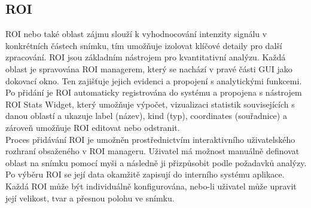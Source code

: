 \documentclass{article}
\begin{document}
\subsection{ROI}
 ROI nebo také oblast zájmu slouží k vyhodnocování intenzity signálu v konkrétních částech snímku, tím umožňuje izolovat klíčové detaily pro další zpracování. ROI jsou základním nástrojem pro kvantitativní analýzu. Každá oblast je spravována ROI managerem, který se nachází v pravé části GUI jako dokovací okno. Ten zajišťuje jejich evidenci a propojení s analytickými funkcemi. Po přidání je ROI automaticky registrována do systému a propojena s nástrojem ROI Stats Widget, který umožňuje výpočet, vizualizaci statistik souvisejících s danou oblastí a ukazuje label (název), kind (typ), coordinates (souřadnice) a zároveň umožňuje ROI editovat nebo odstranit.\\

Proces přidávání ROI je umožněn prostřednictvím interaktivního uživatelského rozhraní obsaženého v ROI manageru. Uživatel má možnost manuálně definovat oblast na snímku pomocí myši a následně ji přizpůsobit podle požadavků analýzy. Po výběru ROI se její data okamžitě zapisují do interního systému aplikace. Každá ROI může být individuálně konfigurována, nebo-li uživatel může upravit její velikost, tvar a přesnou polohu ve snímku.\\
\end{document}
